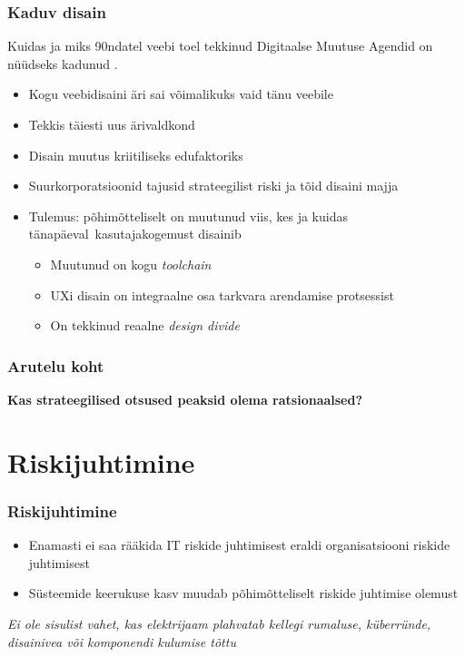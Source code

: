 \begin{frame}[fragile]
  \frametitle{Kaduv disain}
  Kuidas ja miks 90ndatel veebi toel tekkinud Digitaalse Muutuse Agendid on nüüdseks kadunud \citep{design}. 
	\begin{itemize}
		\item Kogu veebidisaini äri sai võimalikuks vaid tänu veebile
		\item Tekkis täiesti uus ärivaldkond
		\item Disain muutus kriitiliseks edufaktoriks
		\item Suurkorporatsioonid tajusid strateegilist riski ja tõid disaini majja
		\item Tulemus: põhimõtteliselt on muutunud viis, kes ja kuidas tänapäeval kasutajakogemust disainib
		\begin{itemize}
			\item Muutunud on kogu \emph{toolchain}
			\item UXi disain on integraalne osa tarkvara arendamise protsessist
			\item On tekkinud reaalne \emph{design divide}
		\end{itemize}		
	\end{itemize}
\end{frame}

\begin{frame}[fragile]
  \frametitle{Arutelu koht}
		\begin{center}
			\textbf{Kas strateegilised otsused peaksid olema ratsionaalsed?}
		\end{center}
\end{frame}

\section{Riskijuhtimine}

\begin{frame}[fragile]
  \frametitle{Riskijuhtimine}
	
	\begin{itemize}
		\item Enamasti ei saa rääkida IT riskide juhtimisest eraldi organisatsiooni riskide juhtimisest
		\item Süsteemide keerukuse kasv muudab põhimõtteliselt riskide juhtimise olemust
	\end{itemize}

	\begin{center}
		\emph{Ei ole sisulist vahet, kas elektrijaam plahvatab kellegi rumaluse, küberründe, disainivea või komponendi kulumise tõttu}
	\end{center}
\end{frame}

